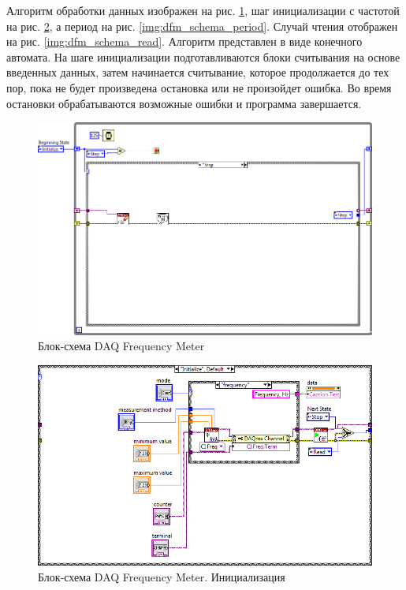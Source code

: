 \documentclass[a4paper,14pt]{article}
\begin{document}
Алгоритм обработки данных изображен на рис. \ref{img:dfm_schema}, шаг инициализации с частотой на рис. \ref{img:dfm_schema_init}, а период на рис. \ref{img:dfm_schema_period}. 
Случай чтения отображен на рис. \ref{img:dfm_schema_read}.
Алгоритм представлен в виде конечного автомата.
На шаге инициализации подготавливаются блоки считывания на основе введенных данных, затем начинается считывание, которое продолжается до тех пор, пока не будет произведена остановка или не произойдет ошибка.
Во время остановки обрабатываются возможные ошибки и программа завершается.

\begin{figure}[H]
	\centering
	\includegraphics[width=\linewidth]{image/dfm_schema}
	\caption{Блок-схема DAQ Frequency Meter}\label{img:dfm_schema}
\end{figure}

\begin{figure}[H]
	\centering
	\includegraphics[width=\linewidth]{image/dfm_schema_init}
	\caption{Блок-схема DAQ Frequency Meter. Инициализация}\label{img:dfm_schema_init}
\end{figure}
\end{document}
